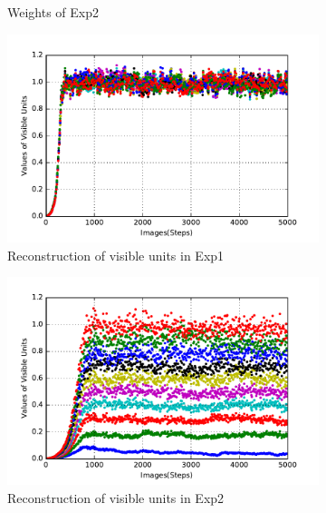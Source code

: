 \begin{figure}
\begin{subfigure}[t]{0.4\textwidth}
		\caption{Weights of Exp2}
	\end{subfigure}
	\begin{subfigure}[t]{0.4\textwidth}
		\includegraphics[width=\textwidth]{pics_sdlm/31_exp_RBM_noise/exp1_recon_s.pdf}
		\caption{Reconstruction of visible units in Exp1}
	\end{subfigure}
	\begin{subfigure}[t]{0.4\textwidth}
		\includegraphics[width=\textwidth]{pics_sdlm/31_exp_RBM_noise/exp2_recon_s.pdf}
		\caption{Reconstruction of visible units in Exp2}
	\end{subfigure}\\
	\begin{subfigure}[t]{0.4\textwidth}

\end{subfigure}
\end{figure}
